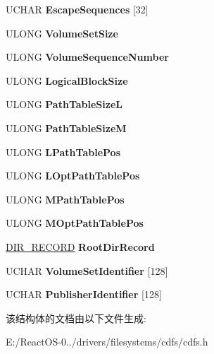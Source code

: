 \begin{DoxyCompactItemize}
U\+C\+H\+AR {\bfseries Escape\+Sequences} \mbox{[}32\mbox{]}
\item 
\mbox{\label{struct___s_v_d_a25a9b14732da7c914ffcf95ae4499360}} 
U\+L\+O\+NG {\bfseries Volume\+Set\+Size}
\item 
\mbox{\label{struct___s_v_d_ab07f4c2b617a40040a26a9e77b2e9f56}} 
U\+L\+O\+NG {\bfseries Volume\+Sequence\+Number}
\item 
\mbox{\label{struct___s_v_d_a3e848fe2917744b819af0abeaa8273c7}} 
U\+L\+O\+NG {\bfseries Logical\+Block\+Size}
\item 
\mbox{\label{struct___s_v_d_a2afb334654e7f4e355d38f4c5af8397a}} 
U\+L\+O\+NG {\bfseries Path\+Table\+SizeL}
\item 
\mbox{\label{struct___s_v_d_ad7e665a0e560d76a75adbc149f72d55f}} 
U\+L\+O\+NG {\bfseries Path\+Table\+SizeM}
\item 
\mbox{\label{struct___s_v_d_aa88a51f31848f0be832682d3d93ab696}} 
U\+L\+O\+NG {\bfseries L\+Path\+Table\+Pos}
\item 
\mbox{\label{struct___s_v_d_a7305a0e75ffde7911a46c8976b51dd2d}} 
U\+L\+O\+NG {\bfseries L\+Opt\+Path\+Table\+Pos}
\item 
\mbox{\label{struct___s_v_d_a9fd953e978d8ef77fdf826c333b9ba3d}} 
U\+L\+O\+NG {\bfseries M\+Path\+Table\+Pos}
\item 
\mbox{\label{struct___s_v_d_a11b8eb5156d2f1fc02855b8d3aa14067}} 
U\+L\+O\+NG {\bfseries M\+Opt\+Path\+Table\+Pos}
\item 
\mbox{\label{struct___s_v_d_a201c9e5d2085cd967126e819bfcc72c8}} 
\hyperlink{struct___d_i_r___r_e_c_o_r_d}{D\+I\+R\+\_\+\+R\+E\+C\+O\+RD} {\bfseries Root\+Dir\+Record}
\item 
\mbox{\label{struct___s_v_d_a566c9f97887d7d9852cb646e0d5d7108}} 
U\+C\+H\+AR {\bfseries Volume\+Set\+Identifier} \mbox{[}128\mbox{]}
\item 
\mbox{\label{struct___s_v_d_a9aecf74bfc260a7259da66202ed4da84}} 
U\+C\+H\+AR {\bfseries Publisher\+Identifier} \mbox{[}128\mbox{]}
\end{DoxyCompactItemize}


该结构体的文档由以下文件生成\+:\begin{DoxyCompactItemize}
\item 
E\+:/\+React\+O\+S-\/0../drivers/filesystems/cdfs/cdfs.\+h\end{DoxyCompactItemize}
